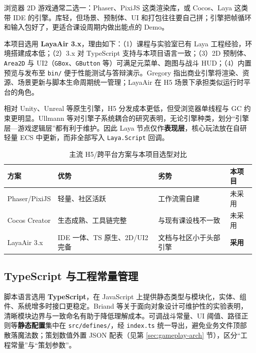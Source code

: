 \documentclass[UTF8,a4paper]{ctexart}
\begin{document}
浏览器 2D 游戏通常二选一：Phaser、PixiJS 这类渲染库，或 Cocos、Laya 这类带 IDE 的引擎。库轻，但场景、预制体、UI 和打包往往要自己拼；引擎把帧循环和输入包好了，更适合课设周期内做出能点的 Demo\cite{goslin2004panda,gregory2018game}。

本项目选用 \textbf{LayaAir 3.x}，理由如下：（1）课程与实验室已有 Laya 工程经验，环境搭建成本低；（2）3.x 对 TypeScript 支持与本项目语言一致；（3）2D 预制体、\texttt{Area2D} 与 UI2（\texttt{GBox}、\texttt{GButton} 等）可满足元菜单、跑图与战斗 HUD；（4）内置预览与发布至 \texttt{bin/} 便于性能测试与答辩演示。Gregory 指出商业引擎将渲染、资源、场景更新与脚本生命周期统一管理\cite{gregory2018game}；LayaAir 在 H5 场景下承担类似运行时平台的角色。

相对 Unity、Unreal 等原生引擎，H5 分发成本更低，但受浏览器单线程与 GC 约束更明显。Ullmann 等对引擎子系统耦合的研究表明，无论引擎种类，划分“引擎层—游戏逻辑层”都有利于维护\cite{ullmann2023coupling}。因此 Laya 节点仅作\textbf{表现层}，核心玩法放在自研轻量 ECS 中更新，而非全部写入 \texttt{Laya.Script} 回调。

\begin{table}[htbp]
  
  \caption{主流 H5/跨平台方案与本项目选型对比}
  \label{tab:engine-compare}
  \begin{tabular}{p{2.8cm}p{4.2cm}p{4.2cm}p{2.8cm}}
    \toprule
    \textbf{方案} & \textbf{优势} & \textbf{劣势} & \textbf{本项目} \\
    \midrule
    Phaser/PixiJS & 轻量、社区活跃 & 工作流需自建 & 未采用 \\
    Cocos Creator & 生态成熟、工具链完整 & 与现有课设栈不一致 & 未采用 \\
    LayaAir 3.x & IDE 一体、TS 原生、2D/UI2 完备 & 文档与社区小于头部引擎 & \textbf{采用} \\
    \bottomrule
  \end{tabular}
\end{table}

\subsection{TypeScript 与工程常量管理}

脚本语言选用 \textbf{TypeScript}，在 JavaScript 上提供静态类型与模块化，实体、组件、系统增多时接口更稳定。Briand 等关于面向对象设计可维护性的实验表明，清晰模块边界与一致命名有助于降低理解成本\cite{briand2001maintainability}。可调战斗常量、UI 阈值、路径正则等\textbf{静态配置}集中在 \texttt{src/defines/}，经 \texttt{index.ts} 统一导出，避免业务文件顶部散落魔法数；策划数值外置 JSON 配表（见第 \ref{sec:gameplay-arch} 节），区分“工程常量”与“策划参数”。
\end{document}
